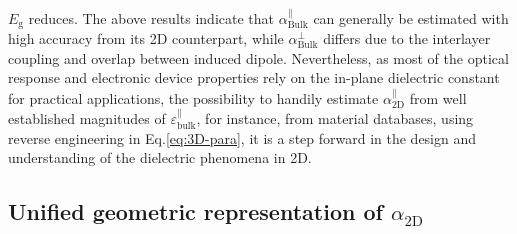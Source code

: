 \documentclass[journal=ancac3,manuscript=article,email=true,hyperref=true,keywords=false]{achemso}
\begin{document}
$E_{\mathrm{g}}$ reduces. The above results indicate that
$\alpha^{\parallel}_{\mathrm{Bulk}}$ can generally be estimated with 
high accuracy from its 2D counterpart, while $\alpha^{\perp}_{\mathrm{Bulk}}$ differs due
to the interlayer coupling and overlap between induced
dipole\cite{Andersen_2015_dielec_vdWH,Laturia_2018}. 
Nevertheless, as most of the optical response and electronic device properties rely on the 
in-plane dielectric constant for practical applications, the possibility to handily
estimate $\alpha_{\mathrm{2D}}^{\parallel}$ from well established magnitudes of 
$\varepsilon_{\mathrm{bulk}}^{\parallel}$, for instance, from material databases,   
using reverse engineering in Eq.\ref{eq:3D-para}, it is a step forward in the 
design and understanding of the dielectric phenomena in 2D. 



\subsection{Unified geometric representation of $\alpha_{\mathrm{2D}}$}
\label{sec:unif-geom-repr}
\end{document}
